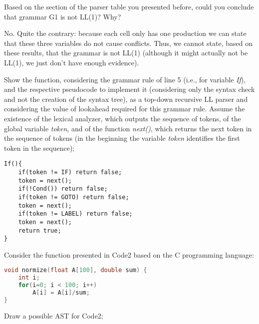 \documentclass[docid=2020]{comp_test1}
\begin{document}
\question
Based on the section of the parser table you presented before, could you conclude that grammar G1 is not LL(1)? Why?

\ansseparator

\noindent
No. Quite the contrary: because each cell only has one production we can state that these three variables do not cause conflicts. Thus, we cannot state, based on these results, that the grammar is not LL(1) (although it might actually not be LL(1), we just don't have enough evidence).

\question
Show the function, considering the grammar rule of line 5 (i.e., for variable \textit{If}), and the respective pseudocode to implement it (considering only the syntax check and not the creation of the syntax tree), as a top-down recursive LL parser and considering the value of lookahead required for this grammar rule. Assume the existence of the lexical analyzer, which outputs the sequence of tokens, of the global variable \textit{token}, and of the function \textit{next()}, which returns the next token in the sequence of tokens (in the beginning the variable \textit{token} identifies the first token in the sequence);

\ansseparator

\begin{lstlisting}
If(){
    if(token != IF) return false;
    token = next();
    if(!Cond()) return false;
    if(token != GOTO) return false;
    token = next();
    if(token != LABEL) return false;
    token = next();
    return true;
}
\end{lstlisting}

\newpage


Consider the function presented in Code2 based on the C programming language:

\begin{lstlisting}[language=c++, caption=Code2]
void normize(float A[100], double sum) {
    int i;
    for(i=0; i < 100; i++)
        A[i] = A[i]/sum;
}
\end{lstlisting}

\question
Draw a possible AST for Code2;

\ansseparator
\end{document}
